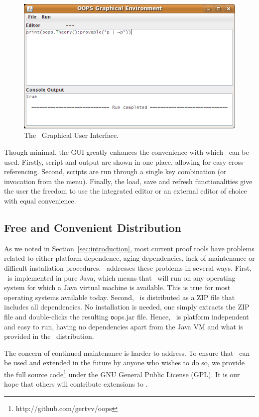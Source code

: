 \begin{figure}[p]
\centering
\includegraphics[scale=.50]{images/gui}
\caption{The \oops\ Graphical User Interface.}
\label{fig:gui}
\end{figure}

Though minimal, the GUI greatly enhances the convenience with which \oops\ can
be used. Firstly, script and output are shown in one place, allowing for easy
cross-referencing. Second, scripts are run through a single key combination
(or invocation from the menu). Finally, the load, save and refresh functionalities
give the user the freedom to use the integrated editor or an external editor
of choice with equal convenience.

\subsection{Free and Convenient Distribution}

As we noted in Section~\ref{sec:introduction}, most current proof tools have
problems related to either platform dependence, aging dependencies, lack of
maintenance or difficult installation procedures. \oops\ addresses these
problems in several ways.
First, \oops\ is implemented in pure Java, which means that \oops\ will run on
any operating system for which a Java virtual machine is available. This is
true for most operating systems available today.
Second, \oops\ is distributed as a ZIP file that includes all dependencies.
No installation is needed, one simply extracts the ZIP file and double-clicks
the resulting {\texttt oops.jar} file.
Hence, \oops\ is platform independent and easy to run, having no dependencies
apart from the Java VM and what is provided in the \oops\ distribution.

The concern of continued maintenance is harder to address. To ensure that
\oops\ can be used and extended in the future by anyone who wishes to do so,
we provide the full source code\footnote{http://github.com/gertvv/oops} under
the GNU General Public License (GPL). It is our hope that others will
contribute extensions to \oops.

